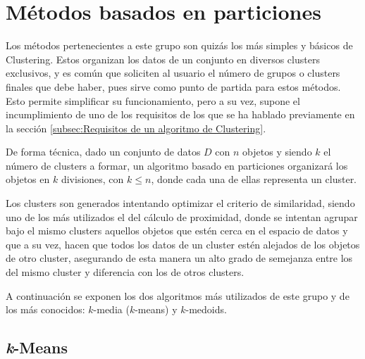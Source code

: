 \documentclass[3p,twocolumn]{elsarticle}
\begin{document}


\section{Métodos basados en particiones} \label{sec:Métodos basados en particiones}

Los métodos pertenecientes a este grupo son quizás los más simples y básicos de Clustering. Estos organizan los datos de un conjunto en diversos clusters exclusivos, y es común que soliciten al usuario el número de grupos o clusters finales que debe haber, pues sirve como punto de partida para estos métodos. Esto permite simplificar su funcionamiento, pero a su vez, supone el incumplimiento de uno de los requisitos de los que se ha hablado previamente en la sección \ref{subsec:Requisitos de un algoritmo de Clustering}.

De forma técnica, dado un conjunto de datos $D$ con $n$ objetos y siendo $k$ el número de clusters a formar, un algoritmo basado en particiones organizará los objetos en $k$ divisiones, con $k \leq n$, donde cada una de ellas representa un cluster. 

Los clusters son generados intentando optimizar el criterio de similaridad, siendo uno de los más utilizados el del cálculo de proximidad, donde se intentan agrupar bajo el mismo clusters aquellos objetos que estén cerca en el espacio de datos y que a su vez, hacen que todos los datos de un cluster estén alejados de los objetos de otro cluster, asegurando de esta manera un alto grado de semejanza entre los del mismo cluster y diferencia con los de otros clusters.

A continuación se exponen los dos algoritmos más utilizados de este grupo y de los más conocidos: $k$-media ($k$-means) y $k$-medoids.




\subsection{\textbf{\textit{k}-Means}} \label{subsec:k-means}
\end{document}
